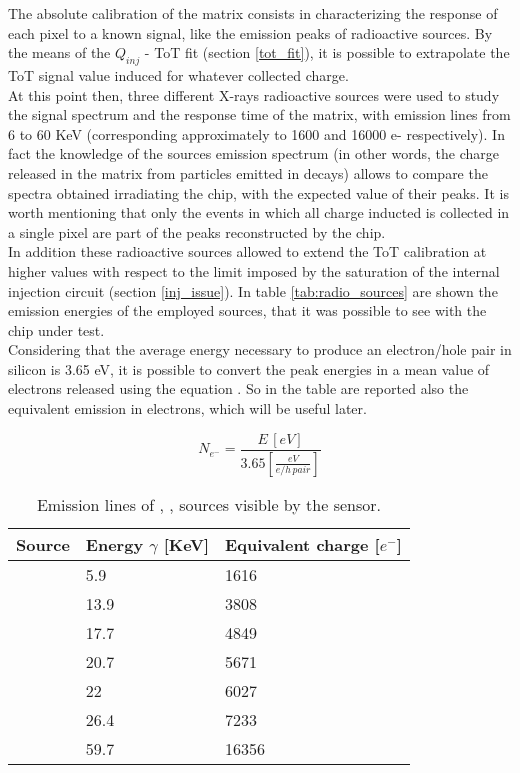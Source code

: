 The absolute calibration of the matrix consists in characterizing the response of each pixel to a known signal, like the emission peaks of radioactive sources. By the means of the $Q_{inj}$ - ToT fit (section \ref{tot_fit}), it is possible to extrapolate the ToT signal value induced for whatever collected charge.\\
At this point then, three different X-rays radioactive sources were used to study the signal spectrum and the response time of the matrix, with emission lines from 6 to 60 KeV (corresponding approximately to 1600 and 16000 e- respectively).
In fact the knowledge of the sources emission spectrum (in other words, the charge released in the matrix from particles emitted in decays) allows to compare the spectra obtained irradiating the chip, with the expected value of their peaks. It is worth mentioning that only the events in which all charge inducted is collected in a single pixel are part of the peaks reconstructed by the chip.\\
In addition these radioactive sources allowed to extend the ToT calibration at higher values with respect to the limit imposed by the saturation of the internal injection circuit (section \ref{inj_issue}). In table \vref{tab:radio_sources} are shown the emission energies of the employed sources, that it was possible to see with the chip under test.\\
Considering that the average energy necessary to produce an electron/hole pair in silicon is 3.65 eV, it is possible to convert the peak energies in a mean value of electrons released using the equation . So in the table are reported also the equivalent emission in electrons, which will be useful later.

\begin{equation}
N_{e^{-}} = \frac{E \, [eV]}{3.65 [\frac{eV}{e/h \, pair}]}
\label{energy_electron_conv}
\end{equation}



\begin{table}[h!]
\centering
\begin{tabular}{>{} C{3cm}|C{2.8cm}|C{2.8cm}}
Source & Energy $\gamma$ [KeV] & Equivalent charge [$e^{-}$]\\[2ex]
\hline
{} & 5.9 & 1616\\[0.5ex]
\hline
{} & 13.9 & 3808\\[0.5ex]
\hline
{} & 17.7 & 4849\\[0.5ex]
\hline
{} & 20.7 & 5671\\[0.5ex]
\hline
{} & 22 & 6027\\[0.5ex]
\hline
{} & 26.4 & 7233\\[0.5ex]
\hline
{} & 59.7 & 16356\\
\hline
\end{tabular}
\caption{Emission lines of , ,  sources visible by the sensor.}
\label{tab:radio_sources}
\end{table}


